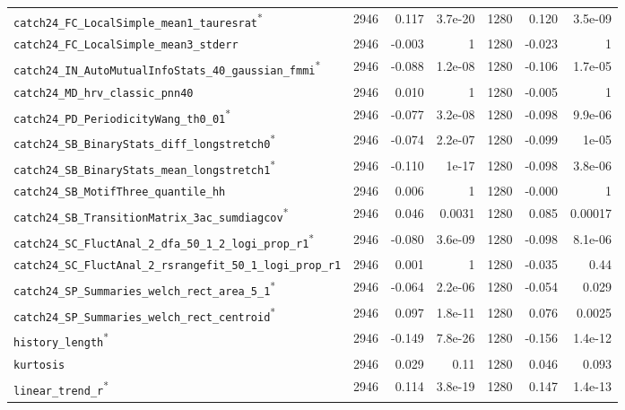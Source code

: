 \begin{longtable}{p{}rrrrrr}
\raggedright \nolinkurl{catch24_FC_LocalSimple_mean1_tauresrat}\textsuperscript{*} & 2946 & 0.117 & 3.7e-20 & 1280 & 0.120 & 3.5e-09 \\
\raggedright \nolinkurl{catch24_FC_LocalSimple_mean3_stderr} & 2946 & -0.003 & 1 & 1280 & -0.023 & 1 \\
\raggedright \nolinkurl{catch24_IN_AutoMutualInfoStats_40_gaussian_fmmi}\textsuperscript{*} & 2946 & -0.088 & 1.2e-08 & 1280 & -0.106 & 1.7e-05 \\
\raggedright \nolinkurl{catch24_MD_hrv_classic_pnn40} & 2946 & 0.010 & 1 & 1280 & -0.005 & 1 \\
\raggedright \nolinkurl{catch24_PD_PeriodicityWang_th0_01}\textsuperscript{*} & 2946 & -0.077 & 3.2e-08 & 1280 & -0.098 & 9.9e-06 \\
\raggedright \nolinkurl{catch24_SB_BinaryStats_diff_longstretch0}\textsuperscript{*} & 2946 & -0.074 & 2.2e-07 & 1280 & -0.099 & 1e-05 \\
\raggedright \nolinkurl{catch24_SB_BinaryStats_mean_longstretch1}\textsuperscript{*} & 2946 & -0.110 & 1e-17 & 1280 & -0.098 & 3.8e-06 \\
\raggedright \nolinkurl{catch24_SB_MotifThree_quantile_hh} & 2946 & 0.006 & 1 & 1280 & -0.000 & 1 \\
\raggedright \nolinkurl{catch24_SB_TransitionMatrix_3ac_sumdiagcov}\textsuperscript{*} & 2946 & 0.046 & 0.0031 & 1280 & 0.085 & 0.00017 \\
\raggedright \nolinkurl{catch24_SC_FluctAnal_2_dfa_50_1_2_logi_prop_r1}\textsuperscript{*} & 2946 & -0.080 & 3.6e-09 & 1280 & -0.098 & 8.1e-06 \\
\raggedright \nolinkurl{catch24_SC_FluctAnal_2_rsrangefit_50_1_logi_prop_r1} & 2946 & 0.001 & 1 & 1280 & -0.035 & 0.44 \\
\raggedright \nolinkurl{catch24_SP_Summaries_welch_rect_area_5_1}\textsuperscript{*} & 2946 & -0.064 & 2.2e-06 & 1280 & -0.054 & 0.029 \\
\raggedright \nolinkurl{catch24_SP_Summaries_welch_rect_centroid}\textsuperscript{*} & 2946 & 0.097 & 1.8e-11 & 1280 & 0.076 & 0.0025 \\
\raggedright \nolinkurl{history_length}\textsuperscript{*} & 2946 & -0.149 & 7.8e-26 & 1280 & -0.156 & 1.4e-12 \\
\raggedright \nolinkurl{kurtosis} & 2946 & 0.029 & 0.11 & 1280 & 0.046 & 0.093 \\
\raggedright \nolinkurl{linear_trend_r}\textsuperscript{*} & 2946 & 0.114 & 3.8e-19 & 1280 & 0.147 & 1.4e-13 \\

\end{longtable}
